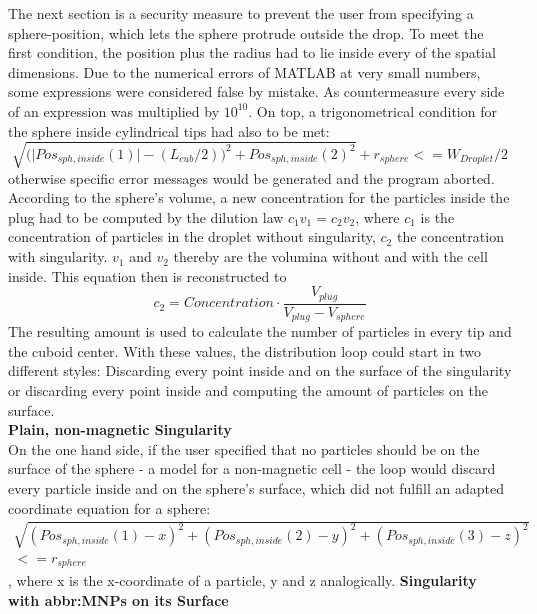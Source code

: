 The next section is a security measure to prevent the user from specifying a sphere-position, which lets the sphere protrude outside the drop. To meet the first condition, the position plus the radius had to lie inside every of the spatial dimensions. Due to the numerical errors of MATLAB at very small numbers, some expressions were considered false by mistake. As countermeasure every side of an expression was multiplied by $10^{10}$. 
On top, a trigonometrical condition for the sphere inside cylindrical tips had also to be met:
\begin{equation}
\sqrt{\big(\lvert Pos_{sph,inside}(1)\rvert - (L_{cub}/2)\big)^2 + Pos_{sph,inside}(2)^2} + r_{sphere}  <= W_{Droplet}/2
\end{equation}
otherwise specific error messages would be generated and the program aborted.\\
According to the sphere's volume, a new concentration for the particles inside the plug had to be computed by the dilution law $c_1v_1 = c_2v_2$, where $c_1$ is the concentration of particles in the droplet without singularity, $c_2$ the concentration with singularity. $v_1$ and $v_2$ thereby are the volumina without and with the cell inside. This equation then is reconstructed to 
\begin{equation}
c_2 = Concentration \cdot \frac{V_{plug}}{V_{plug} - V_{sphere}}
\end{equation}
The resulting amount is used to calculate the number of particles in every tip and the cuboid center. With these values, the distribution loop could start in two different styles: Discarding every point inside and on the surface of the singularity or discarding every point inside and computing the amount of particles on the surface.\bigskip\\
\textbf{Plain, non-magnetic Singularity}
\\
On the one hand side, if the user specified that no particles should be on the surface of the sphere - a model for a non-magnetic cell - the loop would discard every particle inside and on the sphere's surface, which did not fulfill an adapted coordinate equation for a sphere: 
\begin{multline}
\sqrt{(Pos_{sph,inside}(1) - x)^2 + (Pos_{sph,inside}(2) - y)^2 +
	(Pos_{sph,inside}(3) - z)^2} \\<= r_{sphere}
\end{multline}
, where x is the x-coordinate of a particle, y and z analogically.
\newpage
\textbf{Singularity with \glspl{abbr:MNP} on its Surface}
\\
